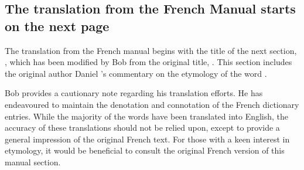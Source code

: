 

\subsection*{The translation from the French Manual starts on the next page}


The translation from the French manual begins with the title of the next section, , which has been modified by Bob  from the original title, . This section includes the original author Daniel 's commentary on the etymology of the word .


Bob  provides a cautionary note regarding his translation efforts. He has endeavoured to maintain the denotation and connotation of the French dictionary entries. While the majority of the words have been translated into English, the accuracy of these translations should not be relied upon, except to provide a general impression of the original French text. For those with a keen interest in etymology, it would be beneficial to consult the original French version of this manual section.

